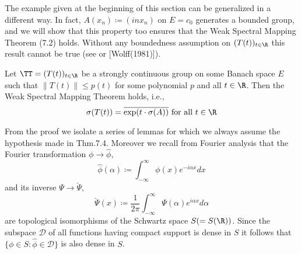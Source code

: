The example given at the beginning of this section can be generalized in a different way.
In fact, $A(x_{n}) \coloneqq (inx_{n})$ on $E = c_{0}$ generates a bounded group, and we will show that this property too ensures that the Weak Spectral Mapping Theorem (7.2) holds.
Without any boundedness assumption on $(T(t))_{t\in\R}$ this result cannot be true (see \citet[Sec.23.16]{hillephillips:1957} or [Wolff(1981)]).


\newpage
\begin{theorem}\label{thm:a3-7.4}
Let $\TT = (T(t))_{t\in\R}$ be a strongly continuous group on some Banach space $E$ such that $\|T(t)\| \leq p(t)$ for some polynomial $p$ and all $t \in \R$.
Then the Weak Spectral Mapping Theorem holds, i.e.,
\[
\sigma(T(t)) = \overline{\exp(t\cdot\sigma(A))} \text{ for all } t \in \R
\]
\end{theorem}

From the proof we isolate a series of lemmas for which we always assume the hypothesis made in Thm.7.4.
Moreover we recall from Fourier analysis that the Fourier transformation $\phi \to \hat{\phi}$,
\[
\hat{\phi}(\alpha) \coloneqq \int_{-\infty}^{\infty} \phi(x)e^{-i\alpha x} dx
\]
and its inverse $\Psi \to \check{\Psi}$,
\[
\check{\Psi}(x) \coloneqq \frac{1}{2\pi}\int_{-\infty}^{\infty} \Psi(\alpha)e^{i\alpha x} d\alpha
\]
are topological isomorphisms of the Schwartz space $S ( = S(\R))$.
Since the subspace $\mathcal{D}$ of all functions having compact support is dense in $S$ it follows that $\{\phi \in S \colon \hat{\phi} \in \mathcal{D}\}$ is also dense in $S$.

